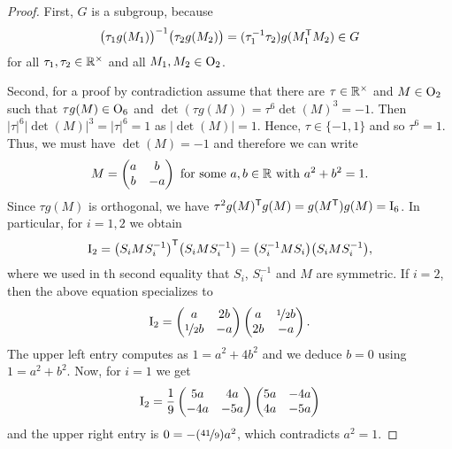 \begin{proof}
	First, $G$ is a subgroup, because
	\[ \big( \tau_1 g(M_1) \big)^{-1} \big( \tau_2 g(M_2) \big) = (\tau_1^{-1} \tau_2) g(M_1^{\mathsf{T}} M_2)  \in G\]
	for all $\tau_1, \tau_2 \in \mathbb R^{\times}$ and all $M_1, M_2 \in \operatorname{O}_2$.
	
	Second, for a proof by contradiction assume that there are $\tau \in \mathbb R^{\times}$ and $M \in \operatorname{O}_2$ such that $\tau g(M) \in \operatorname{O}_6$ and $\det(\tau g(M)) = \tau^6 \det(M)^3 = -1$. Then $| \tau |^6 |\det(M)|^3 = |\tau|^6 = 1$ as $|\det(M)| = 1$. Hence, $\tau \in \{-1, 1\}$ and so $\tau^6 = 1$. Thus, we must have $\det(M) = -1$ and therefore we can write
	\[ M = \begin{pmatrix}
		a & b \\ b & -a
	\end{pmatrix} \text{ for some } a,b \in \mathbb R \text{ with } a^2 + b^2 = 1. \]
	Since $\tau g(M)$ is orthogonal, we have $\tau^2 g(M)^{\mathsf{T}} g(M) = g(M^{\mathsf{T}}) g(M) = \operatorname{I}_6$. In particular, for $i=1,2$ we obtain
	\[ \operatorname{I}_2 = \big(S_i M S_i^{-1} \big)^{\mathsf{T}} \big(S_i M S_i^{-1} \big) 
	= \big( S_i^{-1} M S_i \big) \big( S_i M S_i^{-1} \big), \]
	where we used in th second equality that $S_i$, $S_i^{-1}$ and $M$ are symmetric. If $i=2$, then the above equation specializes to
	\[ \operatorname{I}_2 = \begin{pmatrix} a & 2b \\ \nicefrac{1}{2}b & -a \end{pmatrix}
	\begin{pmatrix} a & \nicefrac{1}{2}b \\ 2b & -a \end{pmatrix}.\]
	The upper left entry computes as $1 = a^2 + 4 b^2$ and we deduce $b = 0$ using $1 = a^2 + b^2$. Now, for $i=1$ we get
	\[\operatorname{I}_2 = \frac{1}{9} \begin{pmatrix} 5a & 4a \\ -4a & -5a \end{pmatrix}
	\begin{pmatrix} 5a & -4a \\ 4a & -5a \end{pmatrix} \]
	and the upper right entry is $0 = -(\nicefrac{41}{9}) a^2$, which contradicts $a^2 = 1$.
\end{proof}

